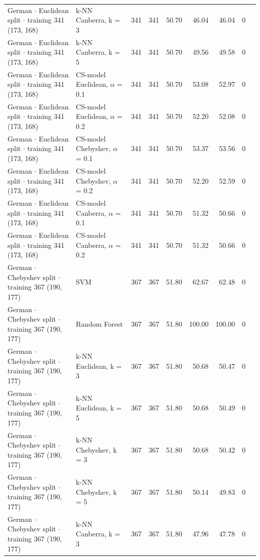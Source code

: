 \begin{longtable}{llrrrrrrl}
  German $\cdot$ Euclidean split $\cdot$ training 341 (173, 168) & k-NN Canberra, k = 3 & 341 & 341 & 50.70 & 46.04 & 46.04 & 0 &  \\
  German $\cdot$ Euclidean split $\cdot$ training 341 (173, 168) & k-NN Canberra, k = 5 & 341 & 341 & 50.70 & 49.56 & 49.58 & 0 &  \\
  German $\cdot$ Euclidean split $\cdot$ training 341 (173, 168) & CS-model Euclidean, $\alpha$ = 0.1 & 341 & 341 & 50.70 & 53.08 & 52.97 & 0 &  \\
  German $\cdot$ Euclidean split $\cdot$ training 341 (173, 168) & CS-model Euclidean, $\alpha$ = 0.2 & 341 & 341 & 50.70 & 52.20 & 52.08 & 0 &  \\
  German $\cdot$ Euclidean split $\cdot$ training 341 (173, 168) & CS-model Chebyshev, $\alpha$ = 0.1 & 341 & 341 & 50.70 & 53.37 & 53.56 & 0 &  \\
  German $\cdot$ Euclidean split $\cdot$ training 341 (173, 168) & CS-model Chebyshev, $\alpha$ = 0.2 & 341 & 341 & 50.70 & 52.20 & 52.59 & 0 &  \\
  German $\cdot$ Euclidean split $\cdot$ training 341 (173, 168) & CS-model Canberra, $\alpha$ = 0.1 & 341 & 341 & 50.70 & 51.32 & 50.66 & 0 &  \\
  German $\cdot$ Euclidean split $\cdot$ training 341 (173, 168) & CS-model Canberra, $\alpha$ = 0.2 & 341 & 341 & 50.70 & 51.32 & 50.66 & 0 &  \\
  German $\cdot$ Chebyshev split $\cdot$ training 367 (190, 177) & SVM & 367 & 367 & 51.80 & 62.67 & 62.48 & 0 &  \\
  German $\cdot$ Chebyshev split $\cdot$ training 367 (190, 177) & Random Forest & 367 & 367 & 51.80 & 100.00 & 100.00 & 0 &  \\
  German $\cdot$ Chebyshev split $\cdot$ training 367 (190, 177) & k-NN Euclidean, k = 3 & 367 & 367 & 51.80 & 50.68 & 50.47 & 0 &  \\
  German $\cdot$ Chebyshev split $\cdot$ training 367 (190, 177) & k-NN Euclidean, k = 5 & 367 & 367 & 51.80 & 50.68 & 50.49 & 0 &  \\
  German $\cdot$ Chebyshev split $\cdot$ training 367 (190, 177) & k-NN Chebyshev, k = 3 & 367 & 367 & 51.80 & 50.68 & 50.42 & 0 &  \\
  German $\cdot$ Chebyshev split $\cdot$ training 367 (190, 177) & k-NN Chebyshev, k = 5 & 367 & 367 & 51.80 & 50.14 & 49.83 & 0 &  \\
  German $\cdot$ Chebyshev split $\cdot$ training 367 (190, 177) & k-NN Canberra, k = 3 & 367 & 367 & 51.80 & 47.96 & 47.78 & 0 &  \\

\end{longtable}
